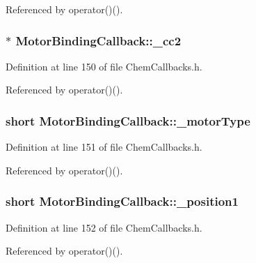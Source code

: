 Referenced by operator()().

\hypertarget{structMotorBindingCallback_a0918d8c091191d95105ab5278c93c4c0}{
\subsubsection[{\+\_\+cc2}]{ $\ast$ Motor\+Binding\+Callback\+::\+\_\+cc2}}\label{structMotorBindingCallback_a0918d8c091191d95105ab5278c93c4c0}


Definition at line 150 of file Chem\+Callbacks.\+h.



Referenced by operator()().

\hypertarget{structMotorBindingCallback_a4eff4c418d4d3f09280c9472232e9559}{
\subsubsection[{\+\_\+motor\+Type}]{\setlength{\rightskip}{0pt plus 5cm}short Motor\+Binding\+Callback\+::\+\_\+motor\+Type}}\label{structMotorBindingCallback_a4eff4c418d4d3f09280c9472232e9559}


Definition at line 151 of file Chem\+Callbacks.\+h.



Referenced by operator()().

\hypertarget{structMotorBindingCallback_a3a0b61cb367e62cd0d1675eac5945d4d}{
\subsubsection[{\+\_\+position1}]{\setlength{\rightskip}{0pt plus 5cm}short Motor\+Binding\+Callback\+::\+\_\+position1}}\label{structMotorBindingCallback_a3a0b61cb367e62cd0d1675eac5945d4d}


Definition at line 152 of file Chem\+Callbacks.\+h.



Referenced by operator()().

